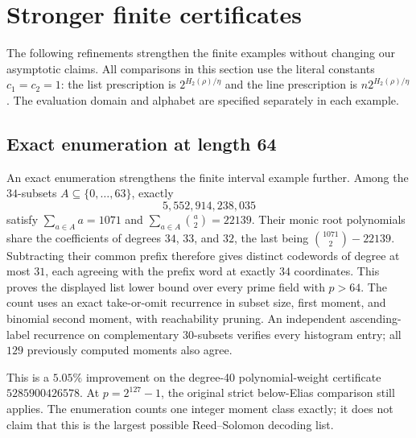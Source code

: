 \section{Stronger finite certificates}
\label{sec:overnight-finite}
The following refinements strengthen the finite examples without changing
our asymptotic claims. All comparisons in this section use the literal
constants $c_1=c_2=1$: the list prescription is
$2^{H_2(\rho)/\eta}$ and the line prescription is
$n2^{H_2(\rho)/\eta}$. The evaluation domain and alphabet are specified
separately in each example.

\subsection{Exact enumeration at length 64}
\label{sec:overnight-exact64}
An exact enumeration strengthens the finite interval example further.
Among the $34$-subsets $A\subseteq\{0,\ldots,63\}$, exactly
\[
 5{,}552{,}914{,}238{,}035
\]
satisfy $\sum_{a\in A}a=1071$ and
$\sum_{a\in A}\binom a2=22139$.
Their monic root polynomials share the coefficients of degrees $34$, $33$,
and $32$, the last being $\binom{1071}{2}-22139$. Subtracting their common
prefix therefore gives distinct codewords of degree at most $31$, each
agreeing with the prefix word at exactly $34$ coordinates. This proves the
displayed list lower bound over every prime field with $p>64$.
The count uses an exact take-or-omit recurrence in subset size, first moment,
and binomial second moment, with reachability pruning. An independent
ascending-label recurrence on complementary $30$-subsets verifies every
histogram entry; all $129$ previously computed moments also agree.

This is a $5.05\%$ improvement on the degree-40 polynomial-weight
certificate $5285900426578$. At $p=2^{127}-1$, the original strict
below-Elias comparison still applies. The enumeration counts one integer
moment class exactly; it does not claim that this is the largest possible
Reed--Solomon decoding list.

